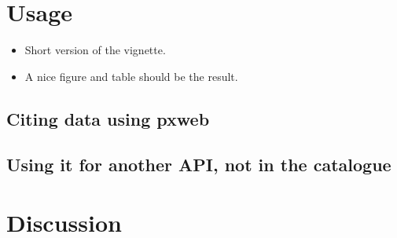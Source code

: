 \documentclass[article]{jss}
\begin{document}


\section[Usage]{Usage}

\begin{itemize}
    \item Short version of the vignette.
    \item A nice figure and table should be the result.
\end{itemize}


\subsection{Citing data using pxweb}

\subsection{Using it for another API, not in the catalogue}


\section[summary]{Discussion}


\end{document}
